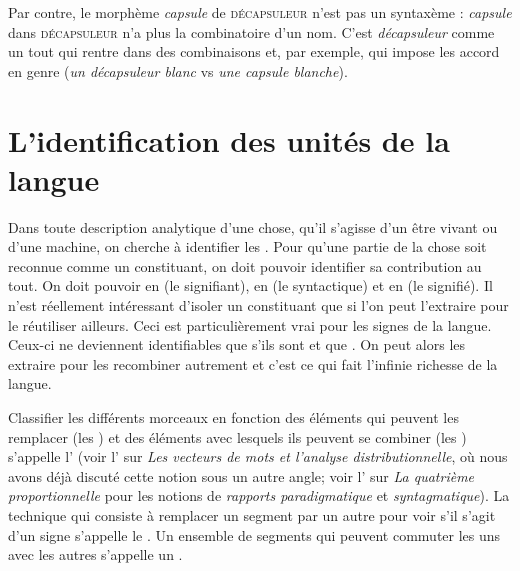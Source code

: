 Par contre, le morphème \textit{capsule} de \textsc{décapsuleur} n’est pas un syntaxème : \textit{capsule} dans \textsc{décapsuleur} n’a plus la combinatoire d’un nom. C’est \textit{décapsuleur} comme un tout qui rentre dans des combinaisons et, par exemple, qui impose les accord en genre (\textit{un décapsuleur blanc} vs \textit{une capsule blanche}).

\section{L’identification des unités de la langue}\label{sec:2.1.7}

Dans toute description analytique d’une chose, qu’il s’agisse d’un être vivant ou d’une machine, on cherche à identifier les . Pour qu’une partie de la chose soit reconnue comme un constituant, on doit pouvoir identifier sa contribution au tout. On doit pouvoir en  (le signifiant), en  (le syntactique) et en  (le signifié). Il n’est réellement intéressant d’isoler un constituant que si l’on peut l’extraire pour le réutiliser ailleurs. Ceci est particulièrement vrai pour les signes de la langue. Ceux-ci ne deviennent identifiables que s’ils sont  et que  . On peut alors les extraire pour les recombiner autrement et c’est ce qui fait l’infinie richesse de la langue.

Classifier les différents morceaux en fonction des éléments qui peuvent les remplacer (les ) et des éléments avec lesquels ils peuvent se combiner (les ) s’appelle l’ (voir l' sur \textit{Les vecteurs de mots et l'analyse distributionnelle}, où nous avons déjà discuté cette notion sous un autre angle; voir l' sur \textit{La quatrième proportionnelle} pour les notions de \textit{rapports paradigmatique} et \textit{syntagmatique}). La technique qui consiste à remplacer un segment par un autre pour voir s’il s’agit d’un signe s’appelle le . Un ensemble de segments qui peuvent commuter les uns avec les autres s’appelle un .

